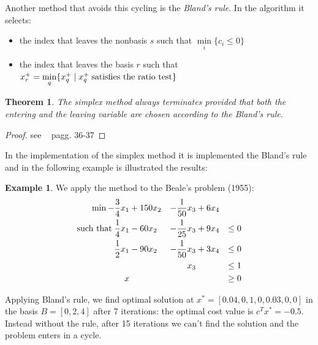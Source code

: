 \documentclass[a4paper,10 pt,titlepage,twoside]{book}
\theoremstyle{plain}
\newtheorem*{theorem*}{Theorem}
\theoremstyle{definition}
\newtheorem{ex}[thm]{Example}
\theoremstyle{remark}
\begin{document}
Another method that avoids this cycling is the \textit{Bland's rule}. In the algorithm it selects:
\begin{itemize}
	\item the index that leaves the nonbasis $s$ such that $\min\limits_{i}\{c_{i}\leq0\}$
\item the index that leaves the basis $r$ such that $x^{+}_{r} = \min\limits_{q}\{x_{q}^{+}\;|\;x_{q}^{+} \text{\;satisfies the ratio test} \}$ \end{itemize} 
\begin{theorem*}
	The simplex method always terminates provided that both the entering and the leaving variable are chosen according to the Bland's rule.
\end{theorem*}
\begin{proof}
see ~\cite{8} pagg. 36-37	
\end{proof}
In the implementation of the simplex method it is implemented the Bland's rule and in the following example is illustrated the results:
\begin{ex}
	We apply the method to the Beale's problem (1955): %
	\begin{alignat*}{4}
	\min -\frac{3}{4}x_{1}&+150x_{2}&-\frac{1}{50}x_{3}&+6x_{4}&\\
	\text{such that\;}\frac{1}{4}x_{1}&-60x_{2}&-\frac{1}{25}x_{3}&+9x_{4}&\leq 0\\
	\frac{1}{2}x_{1}&-90x_{2}&-\frac{1}{50}x_{3}&+3x_{4}&\leq 0\\
	&\;&x_{3}&\;&\leq 1\\
	x&\;&\;&\;&\geq 0\\
	\end{alignat*}
	
Applying Bland's rule, we find optimal solution at $x^{*} = [0.04, 0,  1,   0,  0.03, 0,   0  ]$ in the basis $B = [0, 2, 4]$ after 7 iterations: the optimal cost value is $c^{T}x^{*} = -0.5$.\\
Instead without the rule, after 15 iterations we can't find the solution and the problem enters in a cycle.

\end{ex} 
\end{document}
